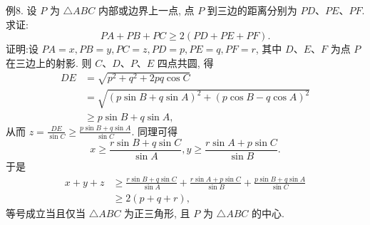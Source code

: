 例8. 设 $P$ 为 $\triangle A B C$ 内部或边界上一点, 点 $P$ 到三边的距离分别为 $P D 、 P E 、 P F$. 求证:
$$
P A+P B+P C \geqslant 2(P D+P E+P F) .
$$
证明:设 $P A=x, P B=y, P C=z, P D=p, P E=q, P F=r$, 其中 $D 、 E 、 F$ 为点 $P$ 在三边上的射影.
则 $C 、 D 、 P 、 E$ 四点共圆, 得
$$
\begin{aligned}
D E & =\sqrt{p^2+q^2+2 p q \cos C} \\
& =\sqrt{(p \sin B+q \sin A)^2+(p \cos B-q \cos A)^2} \\
& \geqslant p \sin B+q \sin A,
\end{aligned}
$$
从而 $z=\frac{D E}{\sin C} \geqslant \frac{p \sin B+q \sin A}{\sin C}$.
同理可得
$$
x \geqslant \frac{r \sin B+q \sin C}{\sin A}, y \geqslant \frac{r \sin A+p \sin C}{\sin B} .
$$
于是
$$
\begin{aligned}
x+y+z & \geqslant \frac{r \sin B+q \sin C}{\sin A}+\frac{r \sin A+p \sin C}{\sin B}+\frac{p \sin B+q \sin A}{\sin C} \\
& \geqslant 2(p+q+r),
\end{aligned}
$$
等号成立当且仅当 $\triangle A B C$ 为正三角形, 且 $P$ 为 $\triangle A B C$ 的中心.



